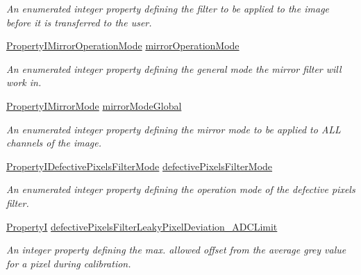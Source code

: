 \begin{DoxyCompactItemize}
\begin{DoxyCompactList}\small\item\em An enumerated integer property defining the filter to be applied to the image before it is transferred to the user. \end{DoxyCompactList}\item 
\hyperlink{group___common_interface_gaeb7e2fadc87b5bf53e5ba09c3255a276}{Property\+I\+Mirror\+Operation\+Mode} \hyperlink{classmv_i_m_p_a_c_t_1_1acquire_1_1_image_processing_afe70a375bdb82e907a6d420c9f40b246}{mirror\+Operation\+Mode}
\begin{DoxyCompactList}\small\item\em An enumerated integer property defining the general mode the mirror filter will work in. \end{DoxyCompactList}\item 
\hyperlink{group___common_interface_ga6adf15b90e84144e36bdfa8e26fb38de}{Property\+I\+Mirror\+Mode} \hyperlink{classmv_i_m_p_a_c_t_1_1acquire_1_1_image_processing_a00449c128b1916f1a00e1f368e0f363c}{mirror\+Mode\+Global}
\begin{DoxyCompactList}\small\item\em An enumerated integer property defining the mirror mode to be applied to A\+L\+L channels of the image. \end{DoxyCompactList}\item 
\hyperlink{group___common_interface_ga1833e6534b35ce9f81fdc3a80cc332d3}{Property\+I\+Defective\+Pixels\+Filter\+Mode} \hyperlink{classmv_i_m_p_a_c_t_1_1acquire_1_1_image_processing_ae1e060a70ed836297ef3886db0bf8a95}{defective\+Pixels\+Filter\+Mode}
\begin{DoxyCompactList}\small\item\em An enumerated integer property defining the operation mode of the defective pixels filter. \end{DoxyCompactList}\item 
\hyperlink{group___common_interface_ga12d5e434238ca242a1ba4c6c3ea45780}{Property\+I} \hyperlink{classmv_i_m_p_a_c_t_1_1acquire_1_1_image_processing_a57e5c8cf92c06a12d27036387978b36d}{defective\+Pixels\+Filter\+Leaky\+Pixel\+Deviation\+\_\+\+A\+D\+C\+Limit}
\begin{DoxyCompactList}\small\item\em An integer property defining the max. allowed offset from the average grey value for a pixel during calibration. \end{DoxyCompactList}\item 

\end{DoxyCompactItemize}
